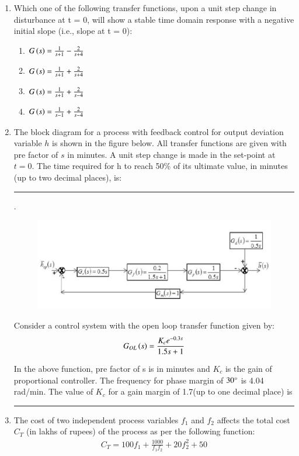 \documentclass[journal,12pt,onecolumn]{IEEEtran}
\theoremstyle{remark}
\begin{document}
\begin{enumerate}
    \item Which one of the following transfer functions, upon a unit step change in disturbance at t = 0, will show a stable time domain response with a negative initial slope (i.e., slope at t = 0):

\hfill{}
    \begin{enumerate}
        \item $G\left(s\right)=\frac{1}{s+1}- \frac{2}{s+4}$
        \item $G\left(s\right)=\frac{1}{s+1}+ \frac{2}{s+4}$
        \item $G\left(s\right)=\frac{1}{s+1}+ \frac{2}{s-4}$
        \item $G\left(s\right)=\frac{1}{s-1}+ \frac{2}{s-4}$
    \end{enumerate}

    \item The block diagram for a process with feedback control for output deviation variable $h$ is shown in the figure below. All transfer functions are given with pre factor of $s$ in minutes. A unit step change is made in the set-point at $t=0$. The time required for h to reach 50\% of its ultimate value, in minutes (up to two decimal places), is: \rule{40pt}{0.1mm}.
    
\begin{figure}[H]
    \centering
    \includegraphics[width=0.5\linewidth]{figs/61.png}
    \caption{}
    \label{fig:61}
\end{figure}

Consider a control system  with the open loop transfer function given by:
\begin{align*}
    G_{OL}\left(s\right)=\frac{K_ce^{-0.3s}}{1.5s+1}
\end{align*}

In the above function, pre factor of s is in minutes and $K_c$ is the gain of proportional controller. The frequency for phase margin of $30\degree $ is 4.04 rad/min. The value of $K_c$ for a gain margin of 1.7(up to one decimal place) is \rule{40pt}{0.1mm}

\hfill{}
    \item The cost of two independent process variables $f_1$ and $f_2$ affects the total cost $C_T$ (in lakhs of rupees) of the process as per the following function:
\begin{align*}
    C_T = 100f_1 + \frac{1000}{f_1f_2} + 20f_2^{2} +50
\end{align*}


\end{enumerate}
\end{document}
